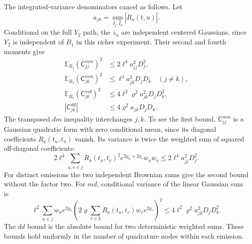 \documentclass[11pt,a4paper]{amsart}
\theoremstyle{plain}
\theoremstyle{definition}
\theoremstyle{remark}
\newcommand{\EE}{\mathbb{E}}
\begin{document}
The integrated-variance denominators cancel as follows. Let
\[
 a_{jk}=\sup_{I_j,I_k}|\dot R_a(t,u)|.
\]
Conditional on the full
$Y_2$ path, the $z_u$ are independent centered Gaussians, since
$Y_2$ is independent of $B_1$ in this richer experiment. Their second and
fourth moments give
\begin{equation}\label{eq:a2-coefficient-bounds}
 \begin{aligned}
 \EE_{B_1}(\mathsf C^{mm}_{jj})^2
       &\le2\ell^4a_{jj}^2D_j^2,\\
 \EE_{B_1}(\mathsf C^{mm}_{jk})^2
       &\le\ell^4a_{jk}^2D_jD_k\quad(j\ne k),\\
 \EE_{B_1}(\mathsf C^{md}_{jk})^2
       &\le4\ell^2\varrho^2 a_{jk}^2D_jD_k^2,\\
 |\mathsf C^{dd}_{jk}|&\le4\varrho^2 a_{jk}D_jD_k.
 \end{aligned}
\end{equation}
The transposed $dm$ inequality interchanges $j,k$. To see the first
bound, $\mathsf C^{mm}_{jj}$ is a Gaussian quadratic form with zero
conditional mean, since its diagonal coefficients $\dot R_a(t_u,t_u)$
vanish. Its variance is twice the weighted sum of squared off-diagonal
coefficients:
\[
 2\ell^4\sum_{u,v\in j}\dot R_a(t_u,t_v)^2
                 e^{2y_u+2y_v}w_uw_v\le2\ell^4a_{jj}^2D_j^2.
\]
For distinct emissions the two independent Brownian sums give the second
bound without the factor two. For $md$, conditional variance of the
linear Gaussian sum is
\[
 \ell^2\sum_{u\in j}w_ue^{2y_u}
    \left(2\varrho\sum_{v\in k}\dot R_a(t_u,t_v)w_ve^{2y_v}\right)^2
 \le4\ell^2\varrho^2a_{jk}^2D_jD_k^2.
\]
The $dd$ bound is the absolute bound for two deterministic weighted sums.
These bounds hold uniformly in the number of quadrature nodes within each emission.
\end{document}
